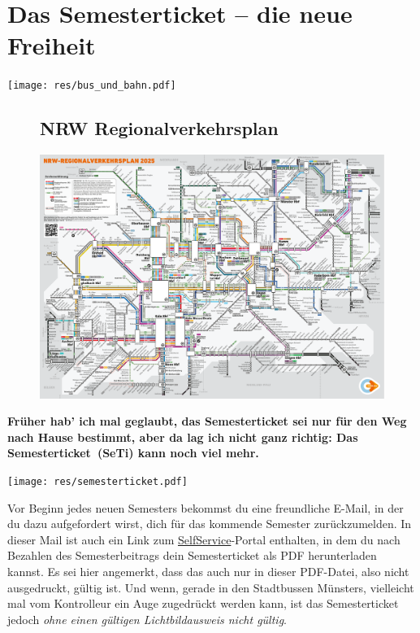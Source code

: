 \section{Das Semesterticket -- die neue Freiheit}

\begin{center}
	\texttt{[image: res/bus\_und\_bahn.pdf]}
\end{center}
\begin{multicols*}{2}
\begin{figure}[t]
	\subsection{NRW Regionalverkehrsplan}
	\includegraphics[width=\textwidth]{res/NRW_Regionalverkehrsplan_2025.pdf}
\end{figure}
\textbf{Früher hab' ich mal geglaubt, das Semesterticket sei nur für den Weg nach Hause bestimmt, aber da lag ich nicht ganz richtig: Das Semesterticket~(SeTi) kann noch viel mehr.}

\texttt{[image: res/semesterticket.pdf]}

Vor Beginn jedes neuen Semesters bekommst du eine freundliche E-Mail, in der du dazu aufgefordert wirst, dich für das kommende Semester zurückzumelden. In dieser Mail ist auch ein Link zum \href{https://zividp.uni-muenster.de/idp/profile/SAML2/POST/SSO?execution=e1s1}{SelfService}-Portal enthalten, in dem du nach Bezahlen des Semesterbeitrags dein Semesterticket als PDF herunterladen kannst. Es sei hier angemerkt, dass das auch nur in dieser PDF-Datei, also nicht ausgedruckt, gültig ist.
Und wenn, gerade in den Stadtbussen Münsters, vielleicht mal vom Kontrolleur ein Auge zugedrückt werden kann, ist das Semesterticket jedoch \textit{ohne einen gültigen Lichtbildausweis nicht gültig}.


\end{multicols*}
